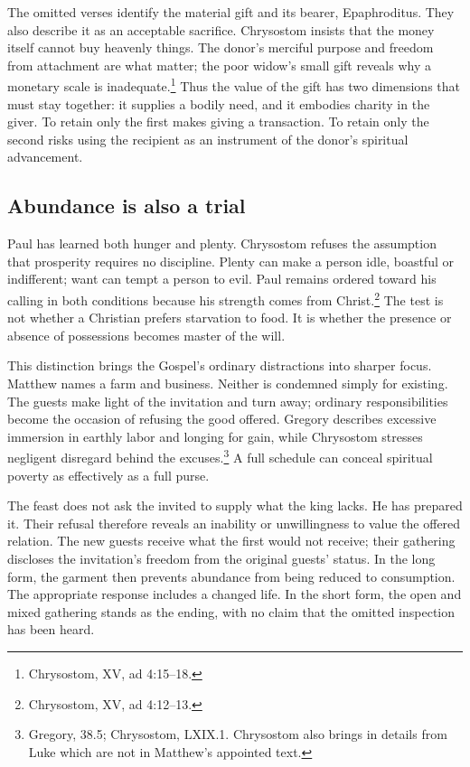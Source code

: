 The omitted verses identify the material gift and its bearer, Epaphroditus. They also describe it as an acceptable sacrifice. Chrysostom insists that the money itself cannot buy heavenly things. The donor's merciful purpose and freedom from attachment are what matter; the poor widow's small gift reveals why a monetary scale is inadequate.\footnote{Chrysostom,  XV, ad 4:15--18.} Thus the value of the gift has two dimensions that must stay together: it supplies a bodily need, and it embodies charity in the giver. To retain only the first makes giving a transaction. To retain only the second risks using the recipient as an instrument of the donor's spiritual advancement.

\subsection{Abundance is also a trial}
Paul has learned both hunger and plenty. Chrysostom refuses the assumption that prosperity requires no discipline. Plenty can make a person idle, boastful or indifferent; want can tempt a person to evil. Paul remains ordered toward his calling in both conditions because his strength comes from Christ.\footnote{Chrysostom,  XV, ad 4:12--13.} The test is not whether a Christian prefers starvation to food. It is whether the presence or absence of possessions becomes master of the will.

This distinction brings the Gospel's ordinary distractions into sharper focus. Matthew names a farm and business. Neither is condemned simply for existing. The guests make light of the invitation and turn away; ordinary responsibilities become the occasion of refusing the good offered. Gregory describes excessive immersion in earthly labor and longing for gain, while Chrysostom stresses negligent disregard behind the excuses.\footnote{Gregory,  38.5; Chrysostom,  LXIX.1. Chrysostom also brings in details from Luke which are not in Matthew's appointed text.} A full schedule can conceal spiritual poverty as effectively as a full purse.

The feast does not ask the invited to supply what the king lacks. He has prepared it. Their refusal therefore reveals an inability or unwillingness to value the offered relation. The new guests receive what the first would not receive; their gathering discloses the invitation's freedom from the original guests' status. In the long form, the garment then prevents abundance from being reduced to consumption. The appropriate response includes a changed life. In the short form, the open and mixed gathering stands as the ending, with no claim that the omitted inspection has been heard.

